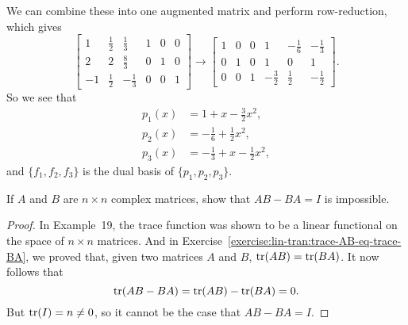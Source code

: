 \begin{solution}
  We can combine these into one augmented matrix and perform
  row-reduction, which gives
  \begin{equation*}
    \begin{bmatrix}
      1 & \frac12 & \frac13 & 1 & 0 & 0 \\[3pt]
      2 & 2 & \frac83 & 0 & 1 & 0 \\[3pt]
      -1 & \frac12 & -\frac13 & 0 & 0 & 1
    \end{bmatrix}
    \rightarrow
    \begin{bmatrix}
      1 & 0 & 0 & 1 & -\frac16 & -\frac13 \\[3pt]
      0 & 1 & 0 & 1 & 0 & 1 \\[3pt]
      0 & 0 & 1 & -\frac32 & \frac12 & -\frac12
    \end{bmatrix}.
  \end{equation*}
  So we see that
  \begin{align*}
    p_1(x) &= 1 + x - \frac32x^2, \\
    p_2(x) &= -\frac16 + \frac12x^2, \\
    p_3(x) &= -\frac13 + x - \frac12x^2,
  \end{align*}
  and $\{f_1,f_2,f_3\}$ is the dual basis of $\{p_1,p_2,p_3\}$.
\end{solution}

 If $A$ and $B$ are $n\times n$ complex matrices, show that
$AB - BA = I$ is impossible.
\begin{proof}
  In Example~19, the trace function was shown to be a linear
  functional on the space of $n\times n$ matrices. And in
  Exercise~\ref{exercise:lin-tran:trace-AB-eq-trace-BA}, we proved
  that, given two matrices $A$ and $B$, $\operatorname{tr}(AB) = \operatorname{tr}(BA)$. It now
  follows that
  \begin{equation*}
    \operatorname{tr}(AB - BA) = \operatorname{tr}(AB) - \operatorname{tr}(BA) = 0.
  \end{equation*}
  But $\operatorname{tr}(I) = n\neq0$, so it cannot be the case that $AB - BA = I$.
\end{proof}

